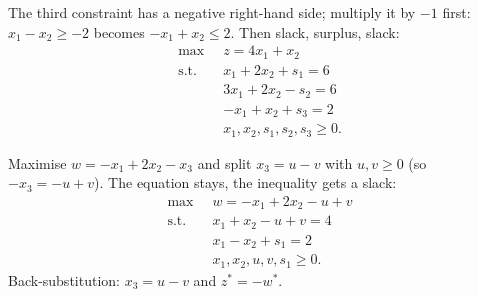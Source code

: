 \begin{solutions}
  \item The third constraint has a negative right-hand side; multiply it
        by $-1$ first: $x_{1}-x_{2}\ge -2$ becomes $-x_{1}+x_{2}\le 2$.
        Then slack, surplus, slack:
        \[
          \begin{aligned}
            \max\;\; & z=4x_{1}+x_{2}\\
            \text{s.t.}\;\; & x_{1}+2x_{2}+s_{1}=6\\
            & 3x_{1}+2x_{2}-s_{2}=6\\
            & -x_{1}+x_{2}+s_{3}=2\\
            & x_{1},x_{2},s_{1},s_{2},s_{3}\ge 0 .
          \end{aligned}
        \]

  \item Maximise $w=-x_{1}+2x_{2}-x_{3}$ and split $x_{3}=u-v$ with
        $u,v\ge 0$ (so $-x_{3}=-u+v$). The equation stays, the inequality
        gets a slack:
        \[
          \begin{aligned}
            \max\;\; & w=-x_{1}+2x_{2}-u+v\\
            \text{s.t.}\;\; & x_{1}+x_{2}-u+v=4\\
            & x_{1}-x_{2}+s_{1}=2\\
            & x_{1},x_{2},u,v,s_{1}\ge 0 .
          \end{aligned}
        \]
        Back-substitution: $x_{3}=u-v$ and $z^{*}=-w^{*}$.


\end{solutions}
